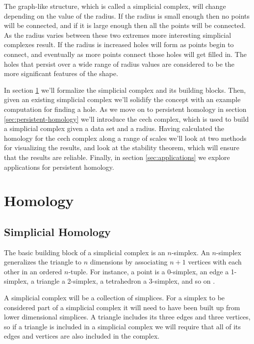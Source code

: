 The graph-like structure, which is called a simplicial complex, will change depending on the value of the radius.
If the radius is small enough then no points will be connected, and if it is large enough then all the points will be connected.
As the radius varies between these two extremes more interesting simplicial complexes result.
If the radius is increased holes will form as points begin to connect, and eventually as more points connect those holes will get filled in.
The holes that persist over a wide range of radius values are considered to be the more significant features of the shape.

In section \ref{sec:homology} we'll formalize the simplicial complex and its building blocks.
Then, given an existing simplicial complex we'll solidify the concept with an example computation for finding a hole.
As we move on to persistent homology in section \ref{sec:persistent-homology} we'll introduce the cech complex, which is used to build a simplicial complex given a data set and a radius.
Having calculated the homology for the cech complex along a range of scales we'll look at two methods for visualizing the results, and  look at the stability theorem, which will ensure that the results are reliable.
Finally, in section \ref{sec:applications} we  explore applications for persistent homology.

\section{Homology}\label{sec:homology}

\subsection{Simplicial Homology}\label{sec:simplicial-homology}

The basic building block of a simplicial complex is an \(n\)-simplex.
An \(n\)-simplex generalizes the triangle to \(n\) dimensions by associating \(n+1\) vertices with each other in an ordered \(n\)-tuple.
For instance, a point is a 0-simplex, an edge a 1-simplex, a triangle a 2-simplex, a tetrahedron a 3-simplex, and so on .

A simplicial complex will be a collection of simplices.
For a simplex to be considered part of a simplicial complex it will need to have been built up from lower dimensional simplices.
A triangle includes its three edges and three vertices, so if a triangle is included in a simplicial complex we will require that all of its edges and vertices are also included in the complex.


